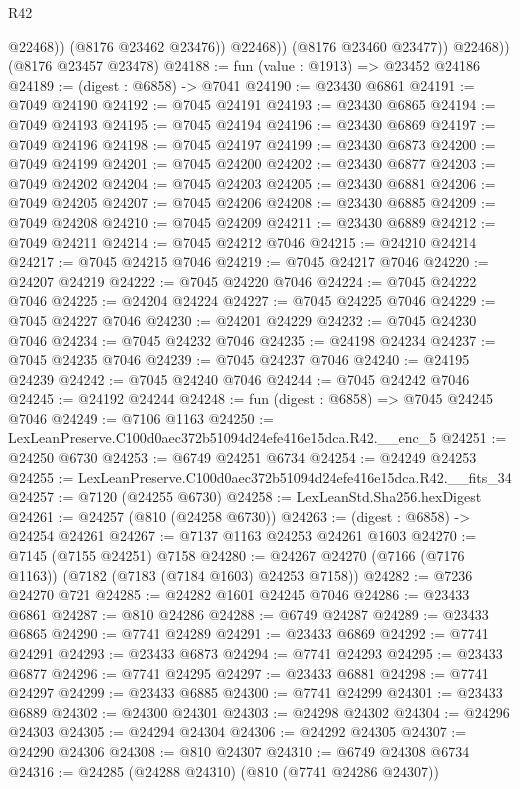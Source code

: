 \begin{lexlean}{R42}
\begin{coremodule}
{                    @22468))
                (@8176 @23462 @23476))
              @22468))
          (@8176 @23460 @23477))
        @22468))
    (@8176 @23457 @23478)
@24188 := fun (value : @1913) => @23452 @24186
@24189 := (digest : @6858) -> @7041
@24190 := @23430 @6861
@24191 := @7049 @24190
@24192 := @7045 @24191
@24193 := @23430 @6865
@24194 := @7049 @24193
@24195 := @7045 @24194
@24196 := @23430 @6869
@24197 := @7049 @24196
@24198 := @7045 @24197
@24199 := @23430 @6873
@24200 := @7049 @24199
@24201 := @7045 @24200
@24202 := @23430 @6877
@24203 := @7049 @24202
@24204 := @7045 @24203
@24205 := @23430 @6881
@24206 := @7049 @24205
@24207 := @7045 @24206
@24208 := @23430 @6885
@24209 := @7049 @24208
@24210 := @7045 @24209
@24211 := @23430 @6889
@24212 := @7049 @24211
@24214 := @7045 @24212 @7046
@24215 := @24210 @24214
@24217 := @7045 @24215 @7046
@24219 := @7045 @24217 @7046
@24220 := @24207 @24219
@24222 := @7045 @24220 @7046
@24224 := @7045 @24222 @7046
@24225 := @24204 @24224
@24227 := @7045 @24225 @7046
@24229 := @7045 @24227 @7046
@24230 := @24201 @24229
@24232 := @7045 @24230 @7046
@24234 := @7045 @24232 @7046
@24235 := @24198 @24234
@24237 := @7045 @24235 @7046
@24239 := @7045 @24237 @7046
@24240 := @24195 @24239
@24242 := @7045 @24240 @7046
@24244 := @7045 @24242 @7046
@24245 := @24192 @24244
@24248 := fun (digest : @6858) => @7045 @24245 @7046
@24249 := @7106 @1163
@24250 := LexLeanPreserve.C100d0aec372b51094d24efe416e15dca.R42.__enc_5
@24251 := @24250 @6730
@24253 := @6749 @24251 @6734
@24254 := @24249 @24253
@24255 := LexLeanPreserve.C100d0aec372b51094d24efe416e15dca.R42.__fits_34
@24257 := @7120 (@24255 @6730)
@24258 := LexLeanStd.Sha256.hexDigest
@24261 := @24257 (@810 (@24258 @6730))
@24263 := (digest : @6858) -> @24254 @24261
@24267 := @7137 @1163 @24253 @24261 @1603
@24270 := @7145 (@7155 @24251) @7158
@24280 := @24267 @24270 (@7166 (@7176 @1163)) (@7182 (@7183 (@7184 @1603) @24253 @7158))
@24282 := @7236 @24270 @721
@24285 := @24282 @1601 @24245 @7046
@24286 := @23433 @6861
@24287 := @810 @24286
@24288 := @6749 @24287
@24289 := @23433 @6865
@24290 := @7741 @24289
@24291 := @23433 @6869
@24292 := @7741 @24291
@24293 := @23433 @6873
@24294 := @7741 @24293
@24295 := @23433 @6877
@24296 := @7741 @24295
@24297 := @23433 @6881
@24298 := @7741 @24297
@24299 := @23433 @6885
@24300 := @7741 @24299
@24301 := @23433 @6889
@24302 := @24300 @24301
@24303 := @24298 @24302
@24304 := @24296 @24303
@24305 := @24294 @24304
@24306 := @24292 @24305
@24307 := @24290 @24306
@24308 := @810 @24307
@24310 := @6749 @24308 @6734
@24316 := @24285 (@24288 @24310) (@810 (@7741 @24286 @24307))
}
\end{coremodule}
\end{lexlean}
